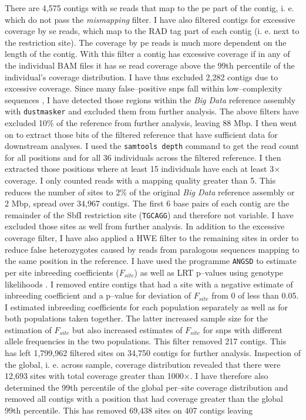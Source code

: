 \documentclass[a4paper,12pt,times,authoryear,twoside,print,index]{Classes/PhDThesisPSnPDF}\usepackage[]{graphicx}\usepackage[]{color}
\begin{document}
There are 4,575 contigs with \gls{se} reads that map to the \gls{pe} part of the contig, i. e. which do not pass the \textit{mismapping} filter. I have also filtered \glspl{contig} for excessive coverage by \gls{se} reads, which map to the \gls{RAD tag} part of each contig (i. e. next to the restriction site). The coverage by \gls{pe} reads is much more dependent on the length of the contig. With this filter a contig has excessive coverage if in any of the individual BAM files it has \gls{se} read coverage above the 99th percentile of the individual's coverage distribution. I have thus excluded 2,282 contigs due to excessive coverage. Since many false--positive \glspl{snp} fall within low--complexity sequences \citep{Li2014}, I have detected those regions within the \emph{Big Data} reference assembly with \texttt{dustmasker} \citep{Morgulis2006} and excluded them from further analysis. The above filters have excluded 10\% of the reference from further analysis, leaving 88 \gls{Mbp}. %
I then went on to extract those bits of the filtered reference that have sufficient data for downstream analyses. I used the \texttt{samtools depth} command to get the read count for all positions and for all 36 individuals across the filtered reference. I then extracted those positions where at least 15 individuals have each at least 3$\times$ coverage. I only counted reads with a mapping quality greater than 5. This reduces the number of sites to 2\% of the original \emph{Big Data} reference assembly or 2 \gls{Mbp}, spread over 34,967 contigs. The first 6 base pairs of each contig are the remainder of the SbfI restriction site (\texttt{TGCAGG}) and therefore not variable. I have excluded those sites as well from further analysis. In addition to the excessive coverage filter, I have also applied a HWE filter to the remaining sites in order to reduce false heterozygotes caused by reads from paralogous sequences mapping to the same position in the reference. I have used the programme \texttt{ANGSD} \citep{Korneliussen2014} to estimate per site inbreeding coefficients ($F_{site}$) as well as LRT p--values using genotype likelihoods \citep{Vieira2013}. I removed entire contigs that had a site with a negative estimate of inbreeding coefficient and a p--value for deviation of $F_{site}$ from 0 of less than 0.05.  I estimated inbreeding coefficients for each population separately as well as for both populations taken together. The latter increased sample size for the estimation of $F_{site}$ but also increased estimates of $F_{site}$ for \glspl{snp} with different allele frequencies in the two populations. This filter removed 217 contigs. This has left 1,799,962 filtered sites on 34,750 contigs for further analysis. Inspection of the global, i. e. across sample, coverage distribution revealed that there were 12,693 sites with total coverage greater than 1000$\times$. I have therefore also determined the 99th percentile of the global per--site coverage distribution and removed all contigs with a position that had coverage greater than the global 99th percentile. This has removed 69,438 sites on 407 contigs leaving 
\end{document}
